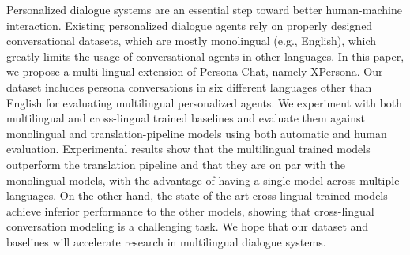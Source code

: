 Personalized dialogue systems are an essential step toward better human-machine interaction. Existing personalized dialogue agents rely on properly designed conversational datasets, which are mostly monolingual (e.g., English), which greatly limits the usage of conversational agents in other languages. In this paper, we propose a multi-lingual extension of Persona-Chat, namely XPersona. Our dataset includes persona conversations in six different languages other than English for evaluating multilingual personalized agents. We experiment with both multilingual and cross-lingual trained baselines and evaluate them against monolingual and translation-pipeline models using both automatic and human evaluation. Experimental results show that the multilingual trained models outperform the translation pipeline and that they are on par with the monolingual models, with the advantage of having a single model across multiple languages. On the other hand, the state-of-the-art cross-lingual trained models achieve inferior performance to the other models, showing that cross-lingual conversation modeling is a challenging task. We hope that our dataset and baselines will accelerate research in multilingual dialogue systems.
